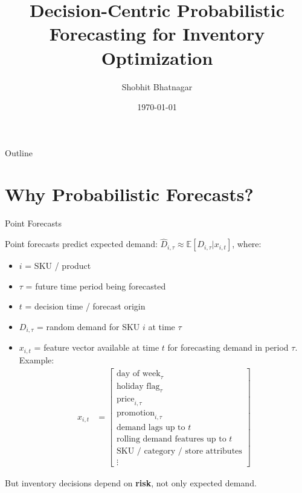 \documentclass[11pt]{beamer}
\title[Probabilistic Forecasting]{Decision-Centric Probabilistic Forecasting for Inventory Optimization}
\author{Shobhit Bhatnagar}
\date{\today}
\begin{document}
\begin{frame}
	\titlepage
\end{frame}

\begin{frame}{Outline}
	\tableofcontents
\end{frame}

\section{Why Probabilistic Forecasts?}
\begin{frame}{Point Forecasts}
\begin{footnotesize}
Point forecasts predict expected demand: $\hat{D}_{i, \tau} \approx \mathbb{E}[D_{i, \tau} | x_{i, t}]$, where:

\begin{itemize}
\item $i$ = SKU / product
\item $\tau$ = future time period being forecasted
\item $t$ = decision time / forecast origin
\item $D_{i, \tau}$ = random demand for SKU $i$ at time $\tau$
\item $x_{i, t}$ = feature vector available at time $t$ for forecasting demand in period $\tau$. Example:
\begin{align*}
x_{i, t} &= \begin{bmatrix} \text{day of week}_\tau \\ \text{holiday flag}_\tau \\ \text{price}_{i, \tau} \\ \text{promotion}_{i,\tau} \\ \text{demand lags up to $t$} \\ \text{rolling demand features up to $t$} \\ \text{SKU / category / store attributes} \\ \vdots \end{bmatrix}
\end{align*}
\end{itemize}
But inventory decisions depend on \textbf{risk}, not only expected demand.
\end{footnotesize}
\end{frame}
\end{document}
